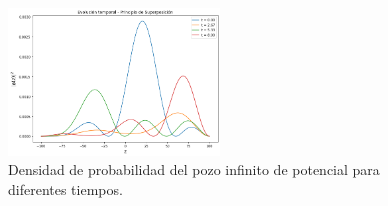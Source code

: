 \documentclass[a4paper]{article}
\theoremstyle{definition}
\theoremstyle{plain}
\begin{document}
\begin{figure}
\begin {center}
\includegraphics[width=0.50\textwidth]{InfiniteTemp.png}
\caption{Densidad de probabilidad del pozo infinito de potencial para diferentes
tiempos.}
\label{fig:InfiniteTemp}
\end {center}
\end{figure}
\end{document}
